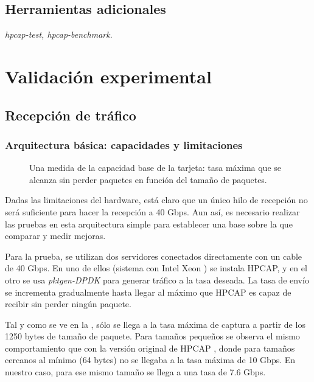 \documentclass[oneside, draft]{epstfg}
\begin{document}
\section{Herramientas adicionales}

\textit{hpcap-test, hpcap-benchmark}.

\chapter{Validación experimental}

\section{Recepción de tráfico}

\subsection{Arquitectura básica: capacidades y limitaciones}

\begin{figure}[btp]
\caption[Capacidad de una arquitectura básica de captura]{Una medida de la capacidad base de la tarjeta: tasa máxima que se alcanza sin perder paquetes en función del tamaño de paquetes.}
\label{fig:Validacion:SimpleArchRate}
\end{figure}

Dadas las limitaciones del hardware, está claro que un único hilo de recepción no será suficiente para hacer la recepción a 40 Gbps. Aun así, es necesario realizar las pruebas en esta arquitectura simple para establecer una base sobre la que comparar y medir mejoras.

Para la prueba, se utilizan dos servidores conectados directamente con un cable de 40 Gbps. En uno de ellos (sistema con Intel Xeon ) se instala HPCAP, y en el otro se usa \textit{pktgen-DPDK} para generar tráfico a la tasa deseada. La tasa de envío se incrementa gradualmente hasta llegar al máximo que HPCAP es capaz de recibir sin perder ningún paquete.

Tal y como se ve en la , sólo se llega a la tasa máxima de captura a partir de los 1250 bytes de tamaño de paquete. Para tamaños pequeños se observa el mismo comportamiento que con la versión original de HPCAP \citep{MorenoTFM2012}, donde para tamaños cercanos al mínimo (64 bytes) no se llegaba a la tasa máxima de 10 Gbps. En nuestro caso, para ese mismo tamaño se llega a una tasa de 7.6 Gbps.
\end{document}
